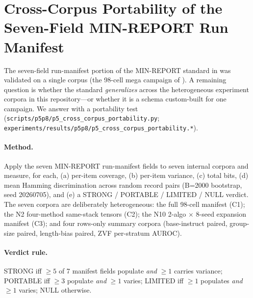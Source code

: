 \section{Cross-Corpus Portability of the Seven-Field MIN-REPORT Run Manifest}
\label{sec:p5-cross-corpus}

The seven-field run-manifest portion of the MIN-REPORT standard in  was
validated on a single corpus (the 98-cell mega campaign of
). A remaining question is whether
the standard \emph{generalizes} across the heterogeneous experiment
corpora in this repository---or whether it is a schema custom-built
for one campaign. We answer with a portability test
(\texttt{scripts/p5p8/p5\_cross\_corpus\_portability.py};
\texttt{experiments/results/p5p8/p5\_cross\_corpus\_portability.*}).

\paragraph{Method.}
Apply the seven MIN-REPORT run-manifest fields to seven internal corpora and
measure, for each, (a) per-item coverage, (b) per-item variance,
(c) total bits, (d) mean Hamming discrimination across random record
pairs (B=2000 bootstrap, seed 20260705), and (e) a STRONG /
PORTABLE / LIMITED / NULL verdict. The seven corpora are
deliberately heterogeneous: the full 98-cell manifest (C1); the
N2 four-method same-stack tensors (C2); the N10 2-algo $\times$
8-seed expansion manifest (C3); and four rows-only summary corpora
(base-instruct paired, group-size paired, length-bias paired, ZVF
per-stratum AUROC).

\paragraph{Verdict rule.}
STRONG iff $\geq 5$ of 7 manifest fields populate \emph{and} $\geq 1$ carries
variance; PORTABLE iff $\geq 3$ populate \emph{and} $\geq 1$
varies; LIMITED iff $\geq 1$ populates \emph{and} $\geq 1$ varies;
NULL otherwise.

